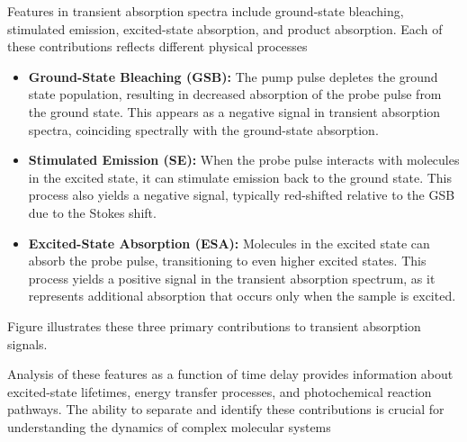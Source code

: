 \noindent Features in transient absorption spectra include ground-state bleaching, stimulated emission, excited-state absorption, and product absorption. Each of these contributions reflects different physical processes %

\begin{itemize}
	\item \textbf{Ground-State Bleaching (GSB):} The pump pulse depletes the ground state population, resulting in decreased absorption of the probe pulse from the ground state. This appears as a negative signal in transient absorption spectra, coinciding spectrally with the ground-state absorption.

	\item \textbf{Stimulated Emission (SE):} When the probe pulse interacts with molecules in the excited state, it can stimulate emission back to the ground state. This process also yields a negative signal, typically red-shifted relative to the GSB due to the Stokes shift.

	\item \textbf{Excited-State Absorption (ESA):} Molecules in the excited state can absorb the probe pulse, transitioning to even higher excited states. This process yields a positive signal in the transient absorption spectrum, as it represents additional absorption that occurs only when the sample is excited.
\end{itemize}


\noindent Figure  illustrates these three primary contributions to transient absorption signals.

\noindent Analysis of these features as a function of time delay provides information about excited-state lifetimes, energy transfer processes, and photochemical reaction pathways. The ability to separate and identify these contributions is crucial for understanding the dynamics of complex molecular systems %

